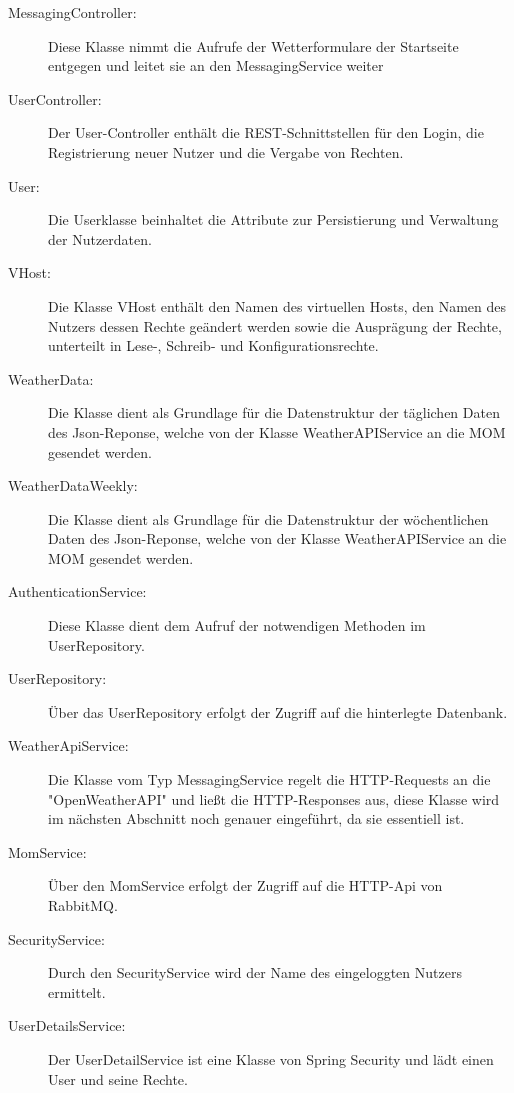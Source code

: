 \begin{description}


\item[MessagingController:]Diese Klasse nimmt die Aufrufe der Wetterformulare der Startseite entgegen und leitet sie an den MessagingService weiter

\item[UserController:]Der User-Controller enthält die REST-Schnittstellen für den Login, die Registrierung neuer Nutzer und die Vergabe von Rechten. 
\item[User:]Die Userklasse beinhaltet die Attribute zur Persistierung und Verwaltung der Nutzerdaten.
\item[VHost:] Die Klasse VHost enthält den Namen des virtuellen Hosts, den Namen des Nutzers dessen Rechte geändert werden sowie die Ausprägung der Rechte, unterteilt in Lese-, Schreib- und Konfigurationsrechte.
\item[WeatherData:]Die Klasse dient als Grundlage für die Datenstruktur der täglichen Daten des Json-Reponse, welche von der Klasse WeatherAPIService an die MOM gesendet werden. 
\item[WeatherDataWeekly:]Die Klasse dient als Grundlage für die Datenstruktur der wöchentlichen Daten des Json-Reponse, welche von der Klasse WeatherAPIService an die MOM gesendet werden. 
\item[AuthenticationService:]Diese Klasse dient dem Aufruf der notwendigen Methoden im UserRepository.
\item[UserRepository:]Über das UserRepository erfolgt der Zugriff auf die hinterlegte Datenbank.
\item[WeatherApiService:]Die Klasse vom Typ MessagingService regelt die HTTP-Requests an die "OpenWeatherAPI" und ließt die HTTP-Responses aus, diese Klasse wird im nächsten Abschnitt noch genauer eingeführt, da sie essentiell ist. 

\item[MomService:]Über den MomService erfolgt der Zugriff auf die HTTP-Api von RabbitMQ.
\item[SecurityService:]Durch den SecurityService wird der Name des eingeloggten Nutzers ermittelt.

\item[UserDetailsService:]Der UserDetailService ist eine Klasse von Spring Security und lädt einen User und seine Rechte.


\end{description}

